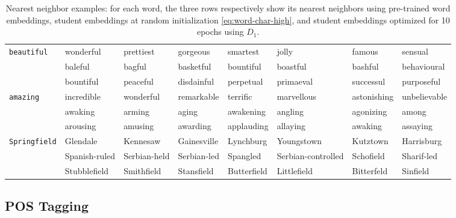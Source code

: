 \documentclass[11pt,letterpaper,UTF8]{article}
\begin{document}
\begin{CJK}{UTF8}{gbsn}
\begin{table*}[t!]
  \begin{center}
    {\scriptsize
      \begin{tabular}{|l|lllllll|}
        \hline
        \texttt{beautiful} &  wonderful  &prettiest   &gorgeous   &smartest   &jolly      &famous     &sensual       \\
        &  baleful    &bagful      &basketful  &bountiful  &boastful   &bashful    &behavioural   \\
        &  bountiful  &peaceful    &disdainful &perpetual  &primaeval  &successul  &purposeful     \\
        \hline
        \texttt{amazing}   &  incredible &wonderful   &remarkable &terrific   &marvellous &astonishing &unbelievable \\
        &  awaking    &arming      &aging      &awakening  &angling    &agonizing   &among        \\
        &  arousing   &amusing     &awarding   &applauding &allaying   &awaking     &assaying     \\
        \hline
        \texttt{Springfield} &  Glendale & Kennesaw   &Gainesville   &Lynchburg  &Youngstown    &Kutztown &Harrisburg \\
        &  Spanish-ruled  & Serbian-held &Serbian-led  &Spangled &Serbian-controlled   &Schofield    &Sharif-led \\
        &  Stubblefield  & Smithfield   &Stansfield    &Butterfield &Littlefield  &Bitterfeld      &Sinfield   \\
        \hline
      \end{tabular}
      \caption{Nearest neighbor examples: for each word, the three rows respectively show its nearest neighbors using
        pre-trained word embeddings, student embeddings at random initialization \eqref{eq:word-char-high}, and student embeddings optimized for 10 epochs using $D_1$.}
        \label{tab:topology}
    }
      \end{center}
  \end{table*}


\subsection{POS Tagging}
\label{subsec:experiments-english}


\end{CJK}
\end{document}
